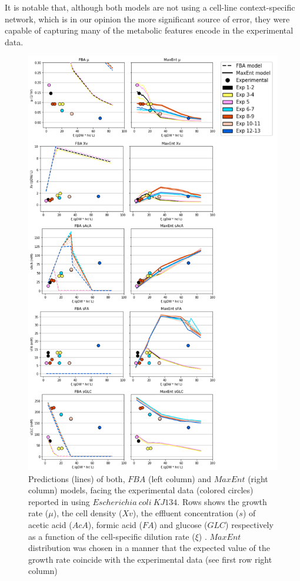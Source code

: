 \documentclass[]{article}
\begin{document}
	It is notable that, although both models are not using a cell-line context-specific network, which is in our opinion the more significant source of error, they were capable of capturing many of the metabolic features encode in the experimental data.
	
	\begin{figure}
		\centering
		\includegraphics[scale = 0.7]{plots_s_EColi}
		\caption{Predictions (lines) of both, $FBA$ (left column) and $MaxEnt$ (right column) models, facing the experimental data (colored circles) reported in \protect{} using $Escherichia\ coli\ KJ134$. Rows shows the growth rate ($\mu$), the cell density ($Xv$), the effluent concentration ($s$) of acetic acid ($AcA$), formic acid ($FA$) and glucose ($GLC$) respectively as a function of the cell-specific dilution rate ($\xi$) . $MaxEnt$ distribution was chosen in a manner that the expected value of the growth rate coincide with the experimental data (see first row right column)}
	\end{figure}
	
\end{document}
